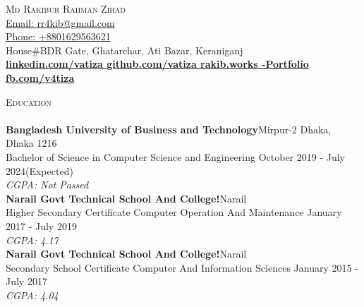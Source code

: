 \documentclass[a4paper]{article}
\newcommand{\lineunder} {
    \vspace*{-8pt} \\
    \hspace*{-18pt} \hrulefill \\
}
\newcommand{\header} [1] {
    {\hspace*{-18pt}\vspace*{9pt} \textsc{#1}}
    \vspace*{-9pt} \lineunder
}
\begin{document}
    \vspace*{-40pt}

    

%
%
  \vspace*{-2pt}
 
    {\Huge \scshape {Md Rakibur Rahman Zihad}}\\
    \vspace*{2pt}
    \vspace*{2pt}
    \href{mailto:rr4kib@gmail.com}{Email: rr4kib@gmail.com}\\ \href{tel:+8801629563621}{Phone: +8801629563621}\\
    House\#BDR Gate, Ghatarchar, Ati Bazar, Keraniganj\\
    \vspace*{2pt} 
    \textbf{\href{https://www.linkedin.com/in/vatiza}{linkedin.com/vatiza }} \newline
    \textbf{\href{https://github.com/vatiza}{github.com/vatiza }} \newline
    \textbf{\href{https://rakib.works/}{rakib.works -Portfolio}} \newline
     \textbf{\href{https://rakib.works/}{fb.com/v4tiza}}
    \vspace*{8mm}




      \header{Education}
      \vspace{2mm}
      \textbf{Bangladesh University of Business and Technology}\hfill Mirpur-2 Dhaka, Dhaka 1216\\
Bachelor of Science in Computer Science and Engineering \hfill October 2019 - July 2024(Expected)\\
{\sl CGPA: Not Passed}\\
\vspace{2mm}
      \textbf{Narail Govt Technical School And College!}\hfill Narail\\
Higher Secondary Certificate Computer Operation And Maintenance \hfill January 2017 - July 2019\\
{\sl CGPA: 4.17}\\
\vspace{2mm}
      \textbf{Narail Govt Technical School And College!}\hfill Narail\\
Secondary School Certificate Computer And Information Sciences \hfill January 2015 - July 2017\\
{\sl CGPA: 4.04}\\
\vspace{4mm}
\end{document}
